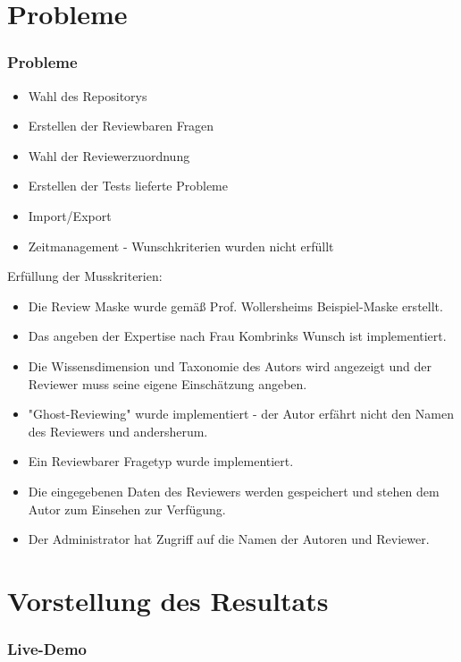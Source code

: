 \documentclass{beamer}
\begin{document}
	\section{Probleme}
		\begin{frame}
			\frametitle{Probleme}
    		\begin{itemize}
    			\item Wahl des Repositorys
		    	\item Erstellen der Reviewbaren Fragen
    			\item Wahl der Reviewerzuordnung
    			\item Erstellen der Tests lieferte Probleme
    			\item Import/Export
    			\item Zeitmanagement - Wunschkriterien wurden nicht erfüllt
    		\end{itemize}
		\end{frame}
		\begin{frame}
			Erfüllung der Musskriterien:
			\begin{itemize}
				\item Die Review Maske wurde gemäß Prof. Wollersheims Beispiel-Maske erstellt.
				\item Das angeben der Expertise nach Frau Kombrinks Wunsch ist implementiert.
				\item Die Wissensdimension und Taxonomie des Autors wird angezeigt und der Reviewer muss seine eigene Einschätzung angeben.
				\item "Ghost-Reviewing" wurde implementiert - der Autor erfährt nicht den Namen des Reviewers und andersherum.
				\item Ein Reviewbarer Fragetyp wurde implementiert.	
				\item Die eingegebenen Daten des Reviewers werden gespeichert und stehen dem Autor zum Einsehen zur Verfügung.
				\item Der Administrator hat Zugriff auf die Namen der Autoren und Reviewer.
			\end{itemize}
		\end{frame}

	\section{Vorstellung des Resultats}
		\begin{frame}
		\frametitle{Live-Demo}
		\end{frame}
\end{document}
